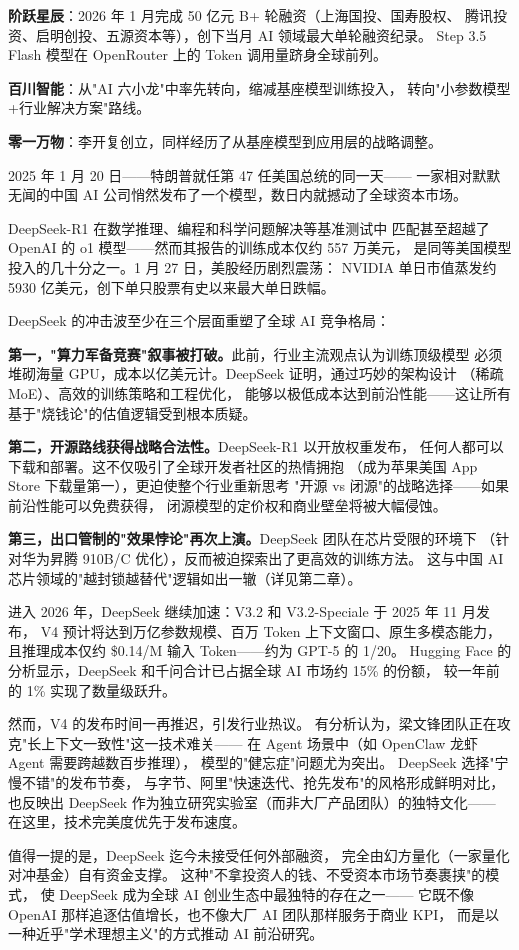 \textbf{阶跃星辰}：2026 年 1 月完成 50 亿元 B+ 轮融资（上海国投、国寿股权、
腾讯投资、启明创投、五源资本等），创下当月 AI 领域最大单轮融资纪录。
Step 3.5 Flash 模型在 OpenRouter 上的 Token 调用量跻身全球前列。

\textbf{百川智能}：从"AI 六小龙"中率先转向，缩减基座模型训练投入，
转向"小参数模型+行业解决方案"路线。

\textbf{零一万物}：李开复创立，同样经历了从基座模型到应用层的战略调整。

\begin{whybox}
2025 年 1 月 20 日——特朗普就任第 47 任美国总统的同一天——
一家相对默默无闻的中国 AI 公司悄然发布了一个模型，数日内就撼动了全球资本市场。

DeepSeek-R1 在数学推理、编程和科学问题解决等基准测试中
匹配甚至超越了 OpenAI 的 o1 模型——然而其报告的训练成本仅约 557 万美元，
是同等美国模型投入的几十分之一。1 月 27 日，美股经历剧烈震荡：
NVIDIA 单日市值蒸发约 5930 亿美元，创下单只股票有史以来最大单日跌幅。

DeepSeek 的冲击波至少在三个层面重塑了全球 AI 竞争格局：

\textbf{第一，"算力军备竞赛"叙事被打破。}此前，行业主流观点认为训练顶级模型
必须堆砌海量 GPU，成本以亿美元计。DeepSeek 证明，通过巧妙的架构设计
（稀疏 MoE）、高效的训练策略和工程优化，
能够以极低成本达到前沿性能——这让所有基于"烧钱论"的估值逻辑受到根本质疑。

\textbf{第二，开源路线获得战略合法性。}DeepSeek-R1 以开放权重发布，
任何人都可以下载和部署。这不仅吸引了全球开发者社区的热情拥抱
（成为苹果美国 App Store 下载量第一），更迫使整个行业重新思考
"开源 vs 闭源"的战略选择——如果前沿性能可以免费获得，
闭源模型的定价权和商业壁垒将被大幅侵蚀。

\textbf{第三，出口管制的"效果悖论"再次上演。}DeepSeek 团队在芯片受限的环境下
（针对华为昇腾 910B/C 优化），反而被迫探索出了更高效的训练方法。
这与中国 AI 芯片领域的"越封锁越替代"逻辑如出一辙（详见第二章）。

进入 2026 年，DeepSeek 继续加速：V3.2 和 V3.2-Speciale 于 2025 年 11 月发布，
V4 预计将达到万亿参数规模、百万 Token 上下文窗口、原生多模态能力，
且推理成本仅约 \$0.14/M 输入 Token——约为 GPT-5 的 1/20。
Hugging Face 的分析显示，DeepSeek 和千问合计已占据全球 AI 市场约 15\% 的份额，
较一年前的 1\% 实现了数量级跃升。

然而，V4 的发布时间一再推迟，引发行业热议。
有分析认为，梁文锋团队正在攻克"长上下文一致性"这一技术难关——
在 Agent 场景中（如 OpenClaw 龙虾 Agent 需要跨越数百步推理），
模型的"健忘症"问题尤为突出。
DeepSeek 选择"宁慢不错"的发布节奏，
与字节、阿里"快速迭代、抢先发布"的风格形成鲜明对比，
也反映出 DeepSeek 作为独立研究实验室（而非大厂产品团队）的独特文化——
在这里，技术完美度优先于发布速度。

值得一提的是，DeepSeek 迄今未接受任何外部融资，
完全由幻方量化（一家量化对冲基金）自有资金支撑。
这种"不拿投资人的钱、不受资本市场节奏裹挟"的模式，
使 DeepSeek 成为全球 AI 创业生态中最独特的存在之一——
它既不像 OpenAI 那样追逐估值增长，也不像大厂 AI 团队那样服务于商业 KPI，
而是以一种近乎"学术理想主义"的方式推动 AI 前沿研究。
\end{whybox}

